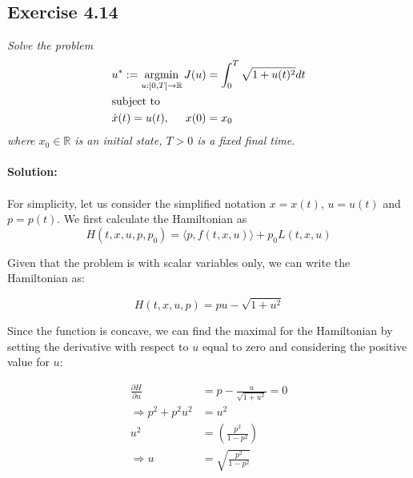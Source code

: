 \subsection{Exercise 4.14}

\emph{Solve the problem}
\begin{align}
    &u^* := \operatorname*{argmin}_{u:[0,T] \to \mathbb{R}} J(u) = \int_0^T \sqrt{1 + u(t)^2}dt \\
    &\text{subject to}\\
    &\Dot{x}(t) = u(t), \hspace{0.5cm} x(0)=x_0
\end{align}
\emph{where $x_0 \in \mathbb{R}$ is an initial state, $T>0$ is a fixed final time.}
\\
\\
\textbf{Solution:}\\
\\
For simplicity, let us consider the simplified notation $x = x(t)$, $u = u(t)$ and $p = p(t)$. We first calculate the Hamiltonian as
\begin{equation}
\label{eq:hamiltonian}
    H(t, x, u, p, p_0) = \langle p, f(t, x, u) \rangle + p_0L(t, x, u)
\end{equation}

Given that the problem is with scalar variables only, we can write the Hamiltonian as: 

\begin{equation}
    H(t, x, u, p) = pu - \sqrt{1+u^2}
\end{equation}

Since the function is concave, we can find the maximal for the Hamiltonian by setting the derivative with respect to $u$ equal to zero and considering the positive value for $u$:

\begin{align}
    \frac{\partial H}{\partial u} &= p - \frac{u}{\sqrt{1+u^2}} = 0\\
    \Longrightarrow p^2 + p^2u^2 &= u^2\\
    u^2 &= \left( \frac{p^2}{1 - p^2} \right)\\
    \Longrightarrow u &= \sqrt{\frac{p^2}{1-p^2}}\\
\end{align}

